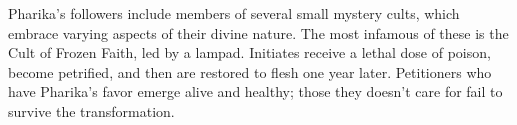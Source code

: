         Pharika's followers include members of several small mystery cults, which embrace varying aspects of their divine nature.
        The most infamous of these is the Cult of Frozen Faith, led by a lampad.
        Initiates receive a lethal dose of poison, become petrified, and then are restored to flesh one year later.
        Petitioners who have Pharika's favor emerge alive and healthy; those they doesn't care for fail to survive the transformation.
